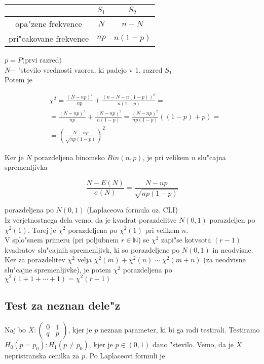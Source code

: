 \documentclass[a4paper,12pt]{article}
\theoremstyle{definition}
\theoremstyle{remark}
\newcommand{\N}{\mathbb{N}}
\begin{document}
\begin{center}
    \begin{tabular}{c | c c}
         & $S_1$ & $S_2$ \\
        \hline
        opa"zene frekvence & $N$ & $n-N$ \\
        pri"cakovane frekvence & $np$ & $n(1-p)$
    \end{tabular}
\end{center}

$p = P($prvi razred$)$ \\
$N \cdots$ "stevilo vrednosti vzorca, ki padejo v 1. razred $S_1$ \\
Potem je

\begin{align*}
    &\chi^2 = \frac{(N-np)^2}{np} + \frac{(n-N - n(1-p))^2}{n(1-p)} = \\
    &= \frac{(N-np)^2}{np} + \frac{(N-np)^2}{n(1-p)} = \frac{(N-np)^2}{np(1-p)} ((1-p) + p) = \\
    &= (\frac{N - np}{\sqrt{n p (1-p)}})^2
\end{align*}

Ker je $N$ porazdeljena binomsko $Bin(n,p)$, je pri velikem $n$ slu"cajna spremenljivka 

\begin{equation*}
    \frac{N - E(N)}{\sigma(N)} =\frac{N - np}{\sqrt{n p (1-p)}}
\end{equation*}

porazdeljena po $N(0,1)$ (Laplaceova formula oz. CLI) \\
Iz verjetnostnega dela vemo, da je kvadrat porazdelitve $N(0,1)$ porazdeljen po $\chi^2(1)$. Torej je $\chi^2$ porazdeljena po
$\chi^2(1)$ pri velikem $n$. \\
V splo"snem primeru (pri poljubnem $r \in \N$) se $\chi^2$ zapi"se kotvsota $(r-1)$ kvadratov slu"cajnih spremenljivk, ki so porazdeljene po
$N(0,1)$ in neodvisne. Ker za porazdelitev $\chi^2$ velja $\chi^2(m) + \chi^2(n) \sim \chi^2(m+n)$ (za neodvisne slu"cajne
spremenljivke), je potem $\chi^2$ porazdeljena po $\chi^2(1 + 1 + \cdots + 1) = \chi^2(r-1)$

\subsection{Test za neznan dele"z}

Naj bo $X: \begin{pmatrix}0 & 1 \\ q & p\end{pmatrix}$, kjer je $p$ neznan parameter, ki bi ga radi testirali. Testiramo
$H_0(p = p_0) : H_1(p \neq p_0)$, kjer je $p \in (0,1)$ dano "stevilo. Vemo, da je $\overline{X}$ nepristranska cenilka za $p$. Po
Laplaceovi formuli je
\end{document}
